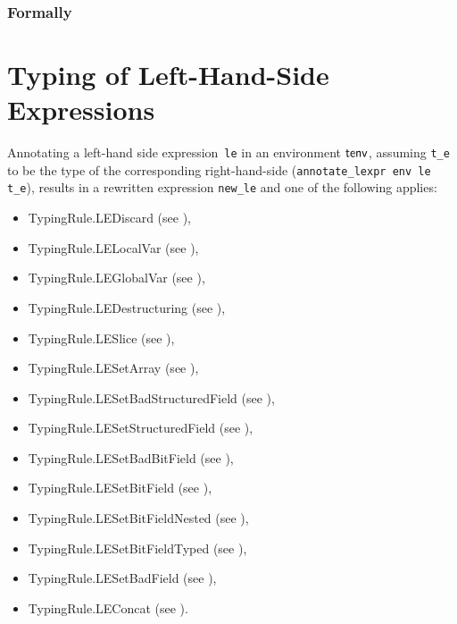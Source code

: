 \documentclass{book}
\newcommand\TypeErrorConfig[0]{\hyperlink{def-typeerrorconfig}{\texttt{\#TE}}}
\newcommand\OrTypeError[0]{\terminateas \TypeErrorConfig}
\newcommand\annotaterel[0]{\hyperlink{def-annotaterel}{\textsf{type}}}
\newcommand\typearrow[0]{\xrightarrow{\annotaterel}}
\newcommand\annotateexpr[1]{\hyperlink{def-annotateexpr}{\texttt{annotate\_expr}(#1)}}
\newcommand\annotateexprlist[1]{\hyperlink{def-annotateexprs}{\texttt{annotate\_exprs}}(#1)}
\begin{document}
\begin{emptyformal}
\subsection{Formally}
\end{emptyformal}


\chapter{Typing of Left-Hand-Side Expressions}

Annotating a left-hand side expression~\texttt{le} in an environment $\textsf{tenv}$, assuming \texttt{t\_e}
to be the type of the corresponding right-hand-side (\texttt{annotate\_lexpr env le t\_e}),
results in a rewritten expression \texttt{new\_le} and one of the following applies:
\begin{itemize}
\item TypingRule.LEDiscard (see ),
\item TypingRule.LELocalVar (see ),
\item TypingRule.LEGlobalVar (see ),
\item TypingRule.LEDestructuring (see ),
\item TypingRule.LESlice (see ),
\item TypingRule.LESetArray (see ),
\item TypingRule.LESetBadStructuredField (see ),
\item TypingRule.LESetStructuredField (see ),
\item TypingRule.LESetBadBitField (see ),
\item TypingRule.LESetBitField (see ),
\item TypingRule.LESetBitFieldNested (see ),
\item TypingRule.LESetBitFieldTyped (see ),
\item TypingRule.LESetBadField (see ),
\item TypingRule.LEConcat (see ).
\end{itemize}
\end{document}
